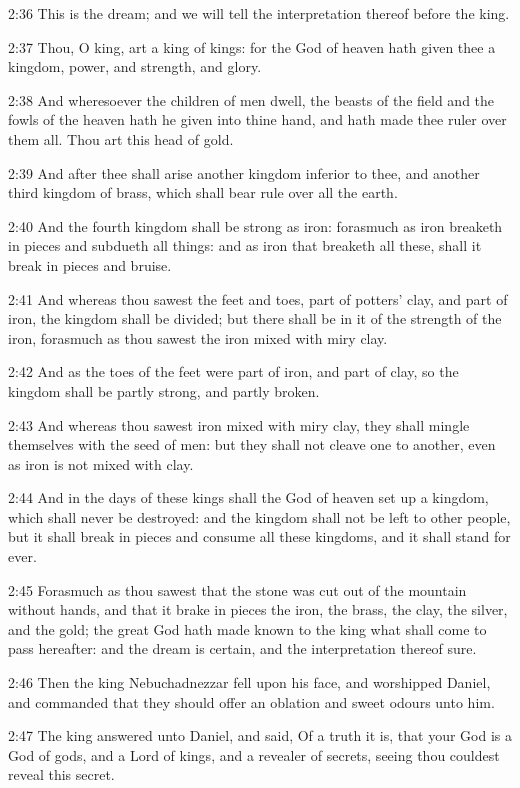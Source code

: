2:36 This is the dream; and we will tell the interpretation thereof before the king.

2:37 Thou, O king, art a king of kings: for the God of heaven hath given thee a kingdom, power, and strength, and glory.

2:38 And wheresoever the children of men dwell, the beasts of the field and the fowls of the heaven hath he given into thine hand, and hath made thee ruler over them all. Thou art this head of gold.

2:39 And after thee shall arise another kingdom inferior to thee, and another third kingdom of brass, which shall bear rule over all the earth.

2:40 And the fourth kingdom shall be strong as iron: forasmuch as iron breaketh in pieces and subdueth all things: and as iron that breaketh all these, shall it break in pieces and bruise.

2:41 And whereas thou sawest the feet and toes, part of potters' clay, and part of iron, the kingdom shall be divided; but there shall be in it of the strength of the iron, forasmuch as thou sawest the iron mixed with miry clay.

2:42 And as the toes of the feet were part of iron, and part of clay, so the kingdom shall be partly strong, and partly broken.

2:43 And whereas thou sawest iron mixed with miry clay, they shall mingle themselves with the seed of men: but they shall not cleave one to another, even as iron is not mixed with clay.

2:44 And in the days of these kings shall the God of heaven set up a kingdom, which shall never be destroyed: and the kingdom shall not be left to other people, but it shall break in pieces and consume all these kingdoms, and it shall stand for ever.

2:45 Forasmuch as thou sawest that the stone was cut out of the mountain without hands, and that it brake in pieces the iron, the brass, the clay, the silver, and the gold; the great God hath made known to the king what shall come to pass hereafter: and the dream is certain, and the interpretation thereof sure.

2:46 Then the king Nebuchadnezzar fell upon his face, and worshipped Daniel, and commanded that they should offer an oblation and sweet odours unto him.

2:47 The king answered unto Daniel, and said, Of a truth it is, that your God is a God of gods, and a Lord of kings, and a revealer of secrets, seeing thou couldest reveal this secret.

